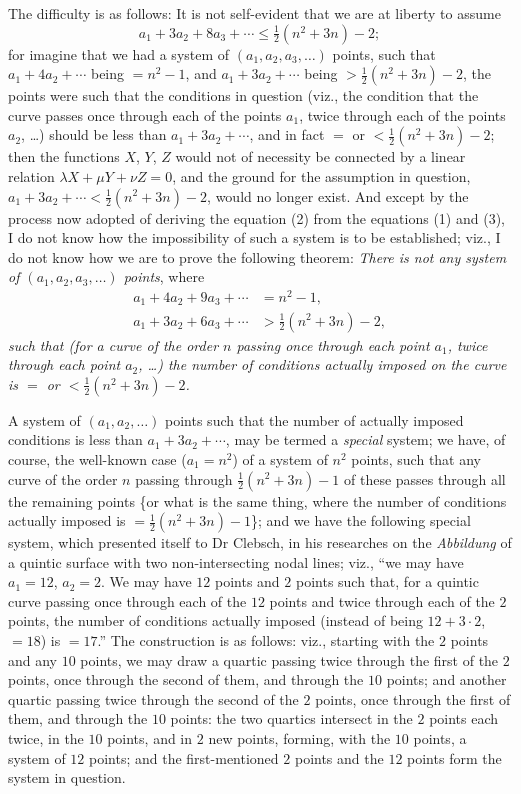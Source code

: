 \documentclass[11pt,a4paper]{article}
\begin{document}
The difficulty is as follows: It is not self-evident that we are at liberty
to assume
\[
a_1 + 3 a_2 + 8 a_3 + \dotsb \leq \tfrac{1}{2}(n^2 + 3n) - 2 ;
\]
for imagine that we had a system of $(a_1, a_2, a_3, \dotsc)$ points, such
that $a_1 + 4 a_2 + \dotsb$ being $= n^2 - 1$, and $a_1 + 3 a_2 + \dotsb$
being $> \tfrac{1}{2}(n^2 + 3n) - 2$, the points were such that the
conditions in question (viz., the condition that the curve passes once
through each of the points $a_1$, twice through each of the points $a_2$,
\dots) should be less than $a_1 + 3 a_2 + \dotsb$, and in fact
$=$ or $< \tfrac{1}{2}(n^2 + 3n) - 2$; then the functions $X$, $Y$, $Z$
would not of necessity be connected by a linear relation
$\lambda X + \mu Y + \nu Z = 0$, and the ground for the assumption in
question, $a_1 + 3 a_2 + \dotsb < \tfrac{1}{2}(n^2 + 3n) - 2$, would no
longer exist. And except by the process now adopted of deriving the
equation (2) from the equations (1) and (3), I do not know how the
impossibility of such a system is to be established; viz., I do not know
how we are to prove the following theorem: \textit{There is not any system
of $(a_1, a_2, a_3, \dotsc)$ points}, where
\[
\begin{aligned}
a_1 + 4 a_2 + 9 a_3 + \dotsb &= n^2 - 1, \\
a_1 + 3 a_2 + 6 a_3 + \dotsb &> \tfrac{1}{2}(n^2 + 3n) - 2,
\end{aligned}
\]
\textit{such that (for a curve of the order $n$ passing once through each
point $a_1$, twice through each point $a_2$, \dots) the number of
conditions actually imposed on the curve is $=$ or $< \tfrac{1}{2}(n^2 + 3n) - 2$.}

\medskip

A system of $(a_1, a_2, \dotsc)$ points such that the number of actually
imposed conditions is less than $a_1 + 3 a_2 + \dotsb$, may be termed a
\textit{special} system; we have, of course, the well-known case
($a_1 = n^2$) of a system of $n^2$ points, such that any curve of the
order $n$ passing through $\tfrac{1}{2}(n^2 + 3n) - 1$ of these passes
through all the remaining points \{or what is the same thing, where the
number of conditions actually imposed is $= \tfrac{1}{2}(n^2 + 3n) - 1$\};
and we have the following special system, which presented itself to
Dr Clebsch, in his researches on the \textit{Abbildung} of a quintic
surface with two non-intersecting nodal lines; viz., ``we may have
$a_1 = 12$, $a_2 = 2$. We may have $12$ points and $2$ points such that,
for a quintic curve passing once through each of the $12$ points and twice
through each of the $2$ points, the number of conditions actually imposed
(instead of being $12 + 3 \cdot 2$, $= 18$) is $= 17$.'' The construction
is as follows: viz., starting with the $2$ points and any $10$ points,
we may draw a quartic passing twice through the first of the $2$ points,
once through the second of them, and through the $10$ points; and another
quartic passing twice through the second of the $2$ points, once through
the first of them, and through the $10$ points: the two quartics intersect
in the $2$ points each twice, in the $10$ points, and in $2$ new points,
forming, with the $10$ points, a system of $12$ points; and the
first-mentioned $2$ points and the $12$ points form the system in question.
\end{document}
